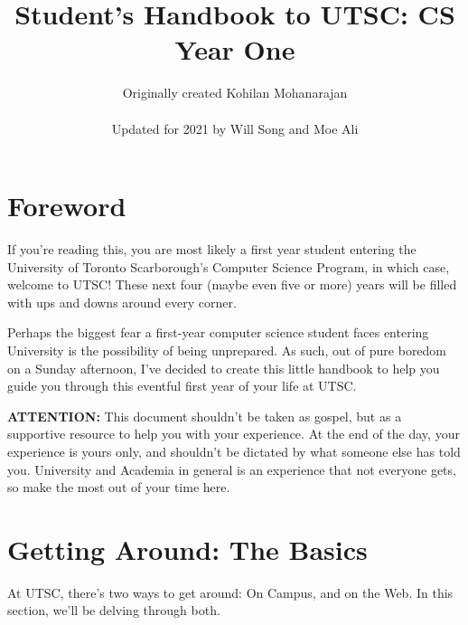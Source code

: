 \documentclass[11pt]{article}
\title{Student's Handbook to UTSC: CS Year One}
\author{Originally created Kohilan Mohanarajan \\ \\ Updated for 2021 by Will Song and Moe Ali}
\begin{document}
\maketitle
\newpage
\tableofcontents
\newpage
\section{Foreword}

If you're reading this, you are most likely a first year student entering the University of Toronto Scarborough's Computer Science Program, in which case, welcome to UTSC!  These next four (maybe even five or more) years will be filled with ups and downs around every corner.\par
Perhaps the biggest fear a first-year computer science student faces entering University is the possibility of being unprepared.  As such, out of pure boredom on a Sunday afternoon, I've decided to create this little handbook to help you guide you through this eventful first year of your life at UTSC.\par
\textbf{ATTENTION:} This document shouldn't be taken as gospel, but as a supportive resource to help you with your experience.  At the end of the day, your experience is yours only, and shouldn't be dictated by what someone else has told you.  University and Academia in general is an experience that not everyone gets, so make the most out of your time here.

\section{Getting Around: The Basics}

At UTSC, there's two ways to get around: On Campus, and on the Web. In this section, we'll be delving through both.
\end{document}
